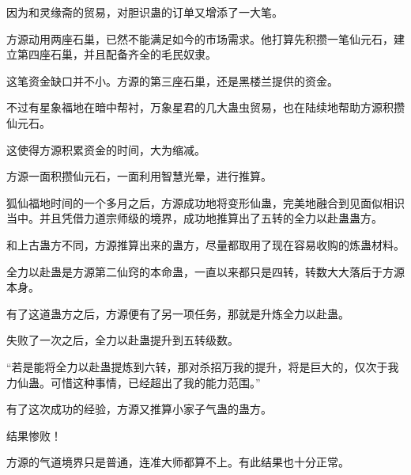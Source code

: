 \begin{this_body}
因为和灵缘斋的贸易，对胆识蛊的订单又增添了一大笔。

方源动用两座石巢，已然不能满足如今的市场需求。他打算先积攒一笔仙元石，建立第四座石巢，并且配备齐全的毛民奴隶。

这笔资金缺口并不小。方源的第三座石巢，还是黑楼兰提供的资金。

不过有星象福地在暗中帮衬，万象星君的几大蛊虫贸易，也在陆续地帮助方源积攒仙元石。

这使得方源积累资金的时间，大为缩减。

方源一面积攒仙元石，一面利用智慧光晕，进行推算。

狐仙福地时间的一个多月之后，方源成功地将变形仙蛊，完美地融合到见面似相识当中。并且凭借力道宗师级的境界，成功地推算出了五转的全力以赴蛊蛊方。

和上古蛊方不同，方源推算出来的蛊方，尽量都取用了现在容易收购的炼蛊材料。

全力以赴蛊是方源第二仙窍的本命蛊，一直以来都只是四转，转数大大落后于方源本身。

有了这道蛊方之后，方源便有了另一项任务，那就是升炼全力以赴蛊。

失败了一次之后，全力以赴蛊提升到五转级数。

“若是能将全力以赴蛊提炼到六转，那对杀招万我的提升，将是巨大的，仅次于我力仙蛊。可惜这种事情，已经超出了我的能力范围。”

有了这次成功的经验，方源又推算小家子气蛊的蛊方。

结果惨败！

方源的气道境界只是普通，连准大师都算不上。有此结果也十分正常。

\end{this_body}

